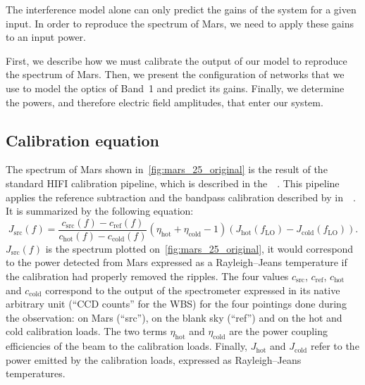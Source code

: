 The interference model alone can only predict the gains of the system for a given input.
In order to reproduce the spectrum of Mars, we need to apply these gains to an input power.


First, we describe how we must calibrate the output of our model to reproduce the spectrum of Mars.
Then, we present the configuration of networks that we use to model the optics of Band~1 and predict its gains.
Finally, we determine the powers, and therefore electric field amplitudes, that enter our system.




\subsection{Calibration equation}

The spectrum of Mars shown in~\cref{fig:mars_25_original} is the result of the standard HIFI calibration pipeline,
which is described in the~~\cite{hifiobserversmanual}.
This pipeline applies the reference subtraction and the bandpass calibration described by \citeauthor{ossenkopf2002intensity} in~~\cite{ossenkopf2002intensity}.
It is summarized by the following equation:
\begin{equation}
    J_\text{src}(f)%
    = 
    \frac{
        c_\text{src}(f) - c_\text{ref}(f)
    }{
        c_\text{hot}(f) - c_\text{cold}(f)
    }
    (\eta_\text{hot} + \eta_\text{cold} - 1)
    (
        J_\text{hot}(f_\text{LO}) - J_\text{cold}(f_\text{LO})
    )
    \text{.}
    \label{eq:mars_calibration}
\end{equation}
$J_\text{src}(f)$ is the spectrum plotted on~\cref{fig:mars_25_original}, it would correspond to the power detected from Mars expressed as a Rayleigh--Jeans temperature if the calibration had properly removed the ripples.
The four values $c_\text{src}$, $c_\text{ref}$, $c_\text{hot}$ and $c_\text{cold}$ correspond to the output of the spectrometer expressed in its native arbitrary unit (``CCD counts'' for the WBS) for the four pointings done during the observation:
on Mars (``src''), on the blank sky (``ref'') and on the hot and cold calibration loads.
The two terms $\eta_\text{hot}$ and $\eta_\text{cold}$ are the power coupling efficiencies of the beam to the calibration loads.
Finally, $J_\text{hot}$ and $J_\text{cold}$ refer to the power emitted by the calibration loads, expressed as Rayleigh--Jeans temperatures.

